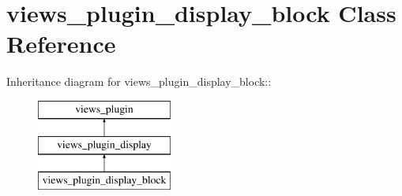 \hypertarget{classviews__plugin__display__block}{
\section{views\_\-plugin\_\-display\_\-block Class Reference}
\label{classviews__plugin__display__block}
}
Inheritance diagram for views\_\-plugin\_\-display\_\-block::\begin{figure}[H]
\begin{center}
\leavevmode
\includegraphics[height=3cm]{classviews__plugin__display__block}
\end{center}
\end{figure}
